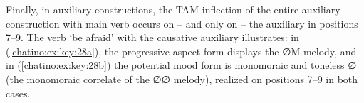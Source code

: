 \documentclass[output=paper]{langscibook}
\begin{document}
\begin{table}
    \caption{Tonal alternations in complex verbal lexemes}
    \label{tab:zenz:key:4}
    
\end{table}

Finally, in auxiliary constructions, the TAM inflection of the entire auxiliary construction with main verb occurs on -- and only on -- the auxiliary in positions 7{}--9. The verb `be afraid' with the causative auxiliary illustrates: in (\ref{chatino:ex:key:28a}), the progressive aspect form displays the ∅M melody, and in (\ref{chatino:ex:key:28b}) the potential mood form is monomoraic and toneless ∅ (the monomoraic correlate of the ∅∅ melody), realized on positions 7{}--9 in both cases.
\end{document}
